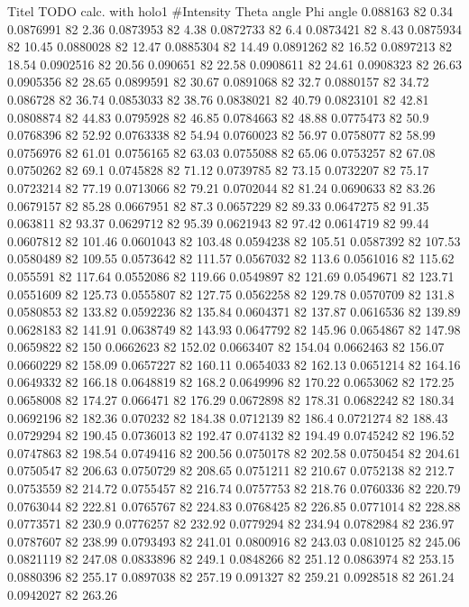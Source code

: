 Titel TODO
calc. with holo1
#Intensity    Theta angle    Phi angle
0.088163 82 0.34
0.0876991 82 2.36
0.0873953 82 4.38
0.0872733 82 6.4
0.0873421 82 8.43
0.0875934 82 10.45
0.0880028 82 12.47
0.0885304 82 14.49
0.0891262 82 16.52
0.0897213 82 18.54
0.0902516 82 20.56
0.090651 82 22.58
0.0908611 82 24.61
0.0908323 82 26.63
0.0905356 82 28.65
0.0899591 82 30.67
0.0891068 82 32.7
0.0880157 82 34.72
0.086728 82 36.74
0.0853033 82 38.76
0.0838021 82 40.79
0.0823101 82 42.81
0.0808874 82 44.83
0.0795928 82 46.85
0.0784663 82 48.88
0.0775473 82 50.9
0.0768396 82 52.92
0.0763338 82 54.94
0.0760023 82 56.97
0.0758077 82 58.99
0.0756976 82 61.01
0.0756165 82 63.03
0.0755088 82 65.06
0.0753257 82 67.08
0.0750262 82 69.1
0.0745828 82 71.12
0.0739785 82 73.15
0.0732207 82 75.17
0.0723214 82 77.19
0.0713066 82 79.21
0.0702044 82 81.24
0.0690633 82 83.26
0.0679157 82 85.28
0.0667951 82 87.3
0.0657229 82 89.33
0.0647275 82 91.35
0.063811 82 93.37
0.0629712 82 95.39
0.0621943 82 97.42
0.0614719 82 99.44
0.0607812 82 101.46
0.0601043 82 103.48
0.0594238 82 105.51
0.0587392 82 107.53
0.0580489 82 109.55
0.0573642 82 111.57
0.0567032 82 113.6
0.0561016 82 115.62
0.055591 82 117.64
0.0552086 82 119.66
0.0549897 82 121.69
0.0549671 82 123.71
0.0551609 82 125.73
0.0555807 82 127.75
0.0562258 82 129.78
0.0570709 82 131.8
0.0580853 82 133.82
0.0592236 82 135.84
0.0604371 82 137.87
0.0616536 82 139.89
0.0628183 82 141.91
0.0638749 82 143.93
0.0647792 82 145.96
0.0654867 82 147.98
0.0659822 82 150
0.0662623 82 152.02
0.0663407 82 154.04
0.0662463 82 156.07
0.0660229 82 158.09
0.0657227 82 160.11
0.0654033 82 162.13
0.0651214 82 164.16
0.0649332 82 166.18
0.0648819 82 168.2
0.0649996 82 170.22
0.0653062 82 172.25
0.0658008 82 174.27
0.066471 82 176.29
0.0672898 82 178.31
0.0682242 82 180.34
0.0692196 82 182.36
0.070232 82 184.38
0.0712139 82 186.4
0.0721274 82 188.43
0.0729294 82 190.45
0.0736013 82 192.47
0.074132 82 194.49
0.0745242 82 196.52
0.0747863 82 198.54
0.0749416 82 200.56
0.0750178 82 202.58
0.0750454 82 204.61
0.0750547 82 206.63
0.0750729 82 208.65
0.0751211 82 210.67
0.0752138 82 212.7
0.0753559 82 214.72
0.0755457 82 216.74
0.0757753 82 218.76
0.0760336 82 220.79
0.0763044 82 222.81
0.0765767 82 224.83
0.0768425 82 226.85
0.0771014 82 228.88
0.0773571 82 230.9
0.0776257 82 232.92
0.0779294 82 234.94
0.0782984 82 236.97
0.0787607 82 238.99
0.0793493 82 241.01
0.0800916 82 243.03
0.0810125 82 245.06
0.0821119 82 247.08
0.0833896 82 249.1
0.0848266 82 251.12
0.0863974 82 253.15
0.0880396 82 255.17
0.0897038 82 257.19
0.091327 82 259.21
0.0928518 82 261.24
0.0942027 82 263.26
